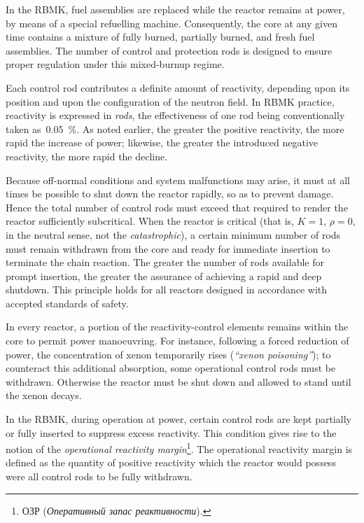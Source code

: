 \documentclass[openright]{bookest}
\begin{document}
In the RBMK, fuel assemblies are replaced while the reactor remains at power, by means of a special refuelling machine. Consequently, the core at any given time contains a mixture of fully burned, partially burned, and fresh fuel assemblies. The number of control and protection rods is designed to ensure proper regulation under this mixed-burnup regime.

Each control rod contributes a definite amount of reactivity, depending upon its position and upon the configuration of the neutron field. In RBMK practice, reactivity is expressed in \textit{rods}, the effectiveness of one rod being conventionally taken as~\qty{0.05}{\percent}. As noted earlier, the greater the positive reactivity, the more rapid the increase of power; likewise, the greater the introduced negative reactivity, the more rapid the decline.

Because off-normal conditions and system malfunctions may arise, it must at all times be possible to shut down the reactor rapidly, so as to prevent damage. Hence the total number of control rods must exceed that required to render the reactor sufficiently subcritical. When the reactor is critical (that is, $K = 1$, $\rho = 0$, in the neutral sense, not the \textit{catastrophic}), a certain minimum number of rods must remain withdrawn from the core and ready for immediate insertion to terminate the chain reaction. The greater the number of rods available for prompt insertion, the greater the assurance of achieving a rapid and deep shutdown. This principle holds for all reactors designed in accordance with accepted standards of safety.

In every reactor, a portion of the reactivity-control elements remains within the core to permit power manoeuvring. For instance, following a forced reduction of power, the concentration of xenon temporarily rises (\textit{``xenon poisoning''}); to counteract this additional absorption, some operational control rods must be withdrawn. Otherwise the reactor must be shut down and allowed to stand until the xenon decays.

In the RBMK, during operation at power, certain control rods are kept partially or fully inserted to suppress excess reactivity. This condition gives rise to the notion of the \textit{operational reactivity margin}\footnote{ОЗР (\textit{Оперативный запас реактивности}).}. The operational reactivity margin is defined as the quantity of positive reactivity which the reactor would possess were all control rods to be fully withdrawn.
\end{document}
